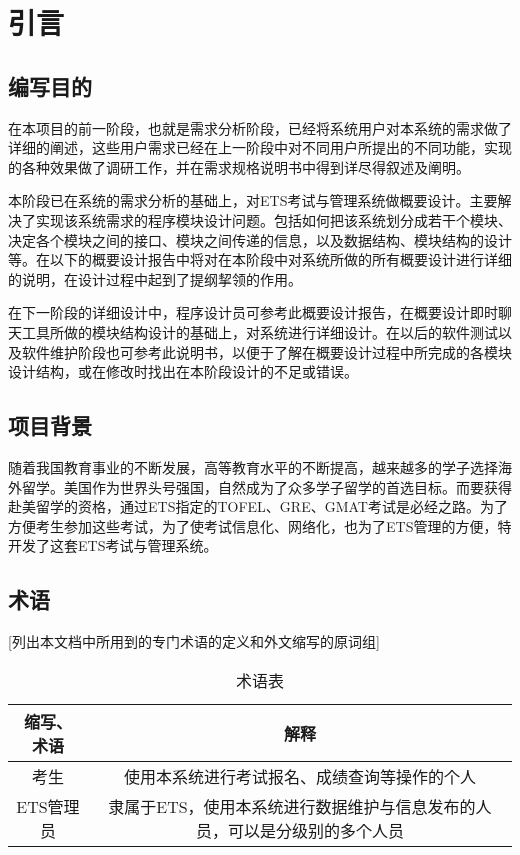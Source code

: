 \chapter{引言}
\section{编写目的}
在本项目的前一阶段，也就是需求分析阶段，已经将系统用户对本系统的需求做了详细的阐述，这些用户需求已经在上一阶段中对不同用户所提出的不同功能，实现的各种效果做了调研工作，并在需求规格说明书中得到详尽得叙述及阐明。

本阶段已在系统的需求分析的基础上，对ETS考试与管理系统做概要设计。主要解决了实现该系统需求的程序模块设计问题。包括如何把该系统划分成若干个模块、决定各个模块之间的接口、模块之间传递的信息，以及数据结构、模块结构的设计等。在以下的概要设计报告中将对在本阶段中对系统所做的所有概要设计进行详细的说明，在设计过程中起到了提纲挈领的作用。

在下一阶段的详细设计中，程序设计员可参考此概要设计报告，在概要设计即时聊天工具所做的模块结构设计的基础上，对系统进行详细设计。在以后的软件测试以及软件维护阶段也可参考此说明书，以便于了解在概要设计过程中所完成的各模块设计结构，或在修改时找出在本阶段设计的不足或错误。


\section{项目背景}
随着我国教育事业的不断发展，高等教育水平的不断提高，越来越多的学子选择海外留学。美国作为世界头号强国，自然成为了众多学子留学的首选目标。而要获得赴美留学的资格，通过ETS指定的TOFEL、GRE、GMAT考试是必经之路。为了方便考生参加这些考试，为了使考试信息化、网络化，也为了ETS管理的方便，特开发了这套ETS考试与管理系统。

\section{术语}
[列出本文档中所用到的专门术语的定义和外文缩写的原词组]
\begin{table}[htbp]
\centering
\caption{术语表} \label{tab:terminology}
\begin{tabular}{|c|c|}
    \hline
    缩写、术语 & 解释 \\
    \hline
    考生 & 使用本系统进行考试报名、成绩查询等操作的个人 \\
    \hline
    ETS管理员 & 隶属于ETS，使用本系统进行数据维护与信息发布的人员，可以是分级别的多个人员 \\
    \hline
\end{tabular}
\end{table}
